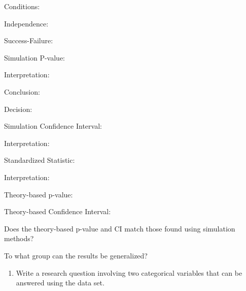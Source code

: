 \documentclass[
]{report}
\providecommand{\tightlist}{%
  \setlength{\itemsep}{0pt}\setlength{\parskip}{0pt}}
\newcommand{\rgi}{\hspace{24pt}}  %
\begin{document}
\vspace{0.3in}

\rgi Conditions:

\rgi \rgi Independence:

\vspace{0.8in}

\rgi \rgi Success-Failure:

\vspace{0.8in}

\rgi Simulation P-value:

\vspace{0.3in}

\rgi \rgi Interpretation:

\vspace{0.8in}

\rgi \rgi Conclusion:

\vspace{0.8in}

\rgi \rgi Decision:

\vspace{0.3in}

\rgi Simulation Confidence Interval:

\vspace{0.3in}

\rgi \rgi Interpretation:

\vspace{0.8in}

\rgi Standardized Statistic:

\vspace{0.3in}

\rgi \rgi Interpretation:

\vspace{0.8in}

\rgi Theory-based p-value:

\vspace{0.3in}

\rgi Theory-based Confidence Interval:

\vspace{0.5in}

\rgi Does the theory-based p-value and CI match those found using simulation methods?

\vspace{0.8in}

\rgi To what group can the results be generalized?

\vspace{0.8in}

\begin{enumerate}
\def\labelenumi{\arabic{enumi}.}
\setcounter{enumi}{2}
\tightlist
\item
  Write a research question involving two categorical variables that can be answered using the data set.
\end{enumerate}
\end{document}
